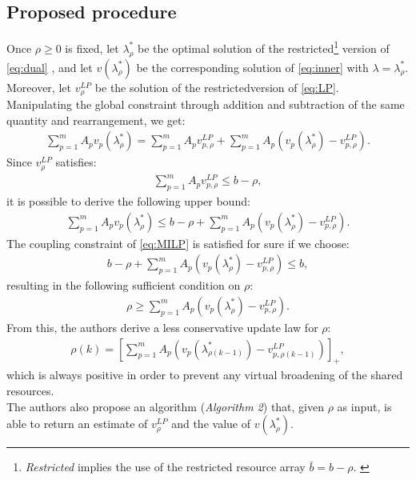 \subsection{Proposed procedure}
Once $\rho \geq 0$ is fixed, let $\lambda_{\rho}^*$ be the optimal solution of the restricted\footnote[1]{\textit{Restricted} implies the use of the restricted resource array $\bar{b} = b - \rho$. \label{fn:restriction}} version of \ref{eq:dual} , and let $v(\lambda_{\rho}^*)$ be the corresponding solution of \ref{eq:inner} with $\lambda = \lambda_{\rho}^*$. Moreover, let $v_{\rho}^{LP}$ be the solution of the restricted\footnotemark[1] version of \ref{eq:LP}.\\
Manipulating the global constraint through addition and subtraction of the same quantity and rearrangement, we get:
\begin{align*}
    \sum_{p = 1}^m A_p v_p(\lambda_{\rho}^*) = \sum_{p = 1}^m A_p v_{p, \rho}^{LP} + \sum_{p = 1}^m A_p (v_p(\lambda_{\rho}^*) - v_{p, \rho}^{LP}).
\end{align*}
Since $v_\rho^{LP}$ satisfies:
\begin{align}
    \sum_{p = 1}^m A_p v_{p, \rho}^{LP} \leq b - \rho, \label{eq:v_LP_ub}
\end{align} 
it is possible to derive the following upper bound:
\begin{align*}
    \sum_{p = 1}^m A_p v_p(\lambda_{\rho}^*) \leq b - \rho + \sum_{p = 1}^m A_p (v_p(\lambda_{\rho}^*) - v_{p, \rho}^{LP}).
\end{align*}
The coupling constraint of \ref{eq:MILP} is satisfied for sure if we choose:
\begin{align*}
    b - \rho + \sum_{p = 1}^m A_p (v_p(\lambda_{\rho}^*) - v_{p, \rho}^{LP}) \leq b,
\end{align*}
resulting in the following sufficient condition on $\rho$:
\begin{align*}
    \rho \geq \sum_{p = 1}^m A_p (v_p(\lambda_{\rho}^*) - v_{p, \rho}^{LP}).
\end{align*}
From this, the authors derive a less conservative update law for $\rho$:
\begin{align}
    \rho(k) = \left[ \sum_{p = 1}^m A_p (v_p(\lambda_{\rho(k-1)}^*) - v_{p, \rho(k-1)}^{LP}) \right]_+, \label{eq:rho_update}
\end{align}
which is always positive in order to prevent any virtual broadening of the shared resources.\\
The authors also propose an algorithm (\textit{Algorithm 2}\supercite{manieri}) that, given $\rho$ as input, is able to return an estimate of $v_\rho^{LP}$ and the value of $v(\lambda_\rho^*)$.

